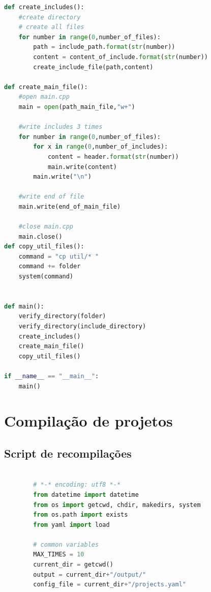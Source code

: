 \begin{apendicesenv}
\begin{lstlisting}[language=Python,caption={
     Script Redundância de Guardas de Inclusão},
                 label=script_redundante_include]
def create_includes():
    #create directory
    # create all files
    for number in range(0,number_of_files):
        path = include_path.format(str(number))
        content = content_of_include.format(str(number))
        create_include_file(path,content)
    
def create_main_file():
    #open main.cpp
    main = open(path_main_file,"w+")

    #write includes 3 times
    for number in range(0,number_of_files):
        for x in range(0,number_of_includes):
            content = header.format(str(number))
            main.write(content)
        main.write("\n")

    #write end of file
    main.write(end_of_main_file)

    #close main.cpp
    main.close()
def copy_util_files():                                                           
    command = "cp util/* "                                                       
    command += folder                                                            
    system(command)                                                              
                    

def main():
    verify_directory(folder)
    verify_directory(include_directory)
    create_includes()
    create_main_file()
    copy_util_files()

if __name__ == "__main__":
    main()

\end{lstlisting}

\chapter{Compilação de projetos}

\section{Script de recompilações}

\begin{lstlisting}[language=Python, caption={Script de Recompilações},
                  label=script_recompilacoes]

        # *-* encoding: utf8 *-*
        from datetime import datetime
        from os import getcwd, chdir, makedirs, system
        from os.path import exists
        from yaml import load

        # common variables
        MAX_TIMES = 10
        current_dir = getcwd()
        output = current_dir+"/output/"
        config_file = current_dir+"/projects.yaml"


\end{lstlisting}
\end{apendicesenv}

